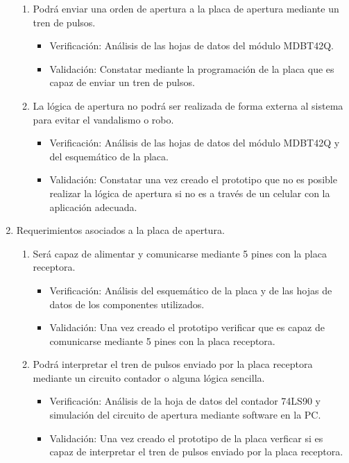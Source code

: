 \documentclass[11pt]{charter}
\begin{document}
\begin{enumerate}
\begin{enumerate}
	\item Podrá enviar una orden de apertura a la placa de apertura mediante un tren de pulsos.
		\begin{itemize}
		\item Verificación: Análisis de las hojas de datos del módulo MDBT42Q.
		\item Validación: Constatar mediante la programación de la placa que es capaz de enviar un tren de pulsos.
		\end{itemize}
		
			\item La lógica de apertura no podrá ser realizada de forma externa al sistema para evitar el vandalismo o robo.
		\begin{itemize}
		\item Verificación: Análisis de las hojas de datos del módulo MDBT42Q y del esquemático de la placa.
		\item Validación: Constatar una vez creado el prototipo que no es posible realizar la lógica de apertura si no es a través de un celular con la aplicación adecuada.
		\end{itemize}
	\end{enumerate}
	
\item Requerimientos asociados a la placa de apertura.
	\begin{enumerate}
	\item Será capaz de alimentar y comunicarse mediante 5 pines con la placa receptora.
		\begin{itemize}
		\item Verificación: Análisis del esquemático de la placa y de las hojas de datos de los componentes utilizados. 
		\item Validación: Una vez creado el prototipo verificar que es capaz de comunicarse mediante 5 pines con la placa receptora.
		\end{itemize}

	\item Podrá interpretar el tren de pulsos enviado por la placa receptora mediante un circuito contador o alguna lógica sencilla.
		\begin{itemize}
		\item Verificación: Análisis de la hoja de datos del contador 74LS90 y simulación del circuito de apertura mediante software en la PC.
		\item Validación: Una vez creado el prototipo de la placa verficar si es capaz de interpretar el tren de pulsos enviado por la placa receptora.
		\end{itemize}


\end{enumerate}
\end{enumerate}
\end{document}
